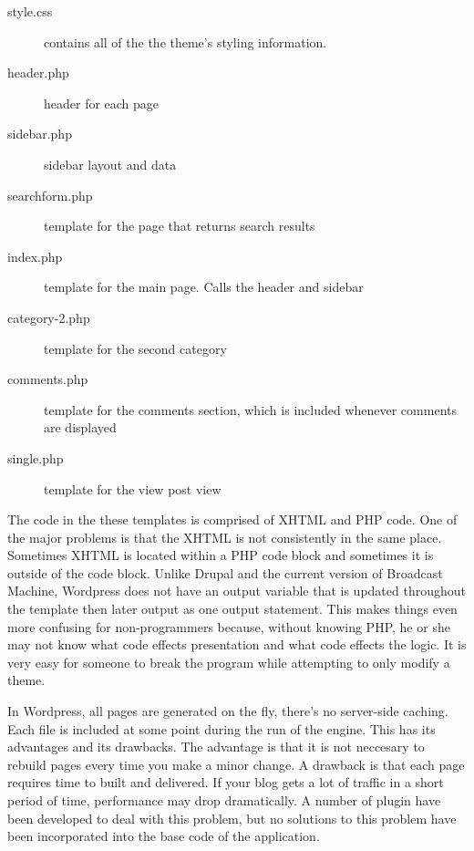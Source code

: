 \documentclass[a4paper,12pt]{report}
\begin{document}
\begin{description}
\item[style.css] contains all of the the theme's styling information.
\item[header.php] header for each page
\item[sidebar.php] sidebar layout and data
\item[searchform.php] template for the page that returns search results
\item[index.php] template for the main page. Calls the header and sidebar
\item[category-2.php] template for the second category
\item[comments.php] template for the comments section, which is included whenever comments are displayed
\item[single.php] template for the view post view
\end{description}

The code in the these templates is comprised of XHTML and PHP code. 
One of the major problems is that the XHTML is not consistently in the same place. 
Sometimes XHTML is located within a PHP code block and sometimes it is outside of the code block. 
Unlike Drupal and the current version of Broadcast Machine, Wordpress does not have an output variable that is updated throughout the template then later output as one output statement. 
This makes things even more confusing for non-programmers because, without knowing PHP, he or she may not know what code effects presentation and what code effects the logic. 
It is very easy for someone to break the program while attempting to only modify a theme. 


In Wordpress, all pages are generated on the fly, there's no server-side caching. 
Each file is included at some point during the run of the engine. 
This has its advantages and its drawbacks. 
The advantage is that it is not neccesary to rebuild pages every time you make a minor change. 
A drawback is that each page requires time to built and delivered. 
If your blog gets a lot of traffic in a short period of time, performance may drop dramatically. 
A number of plugin have been developed to deal with this problem, but no solutions to this problem have been incorporated into the base code of the application. 
\end{document}
